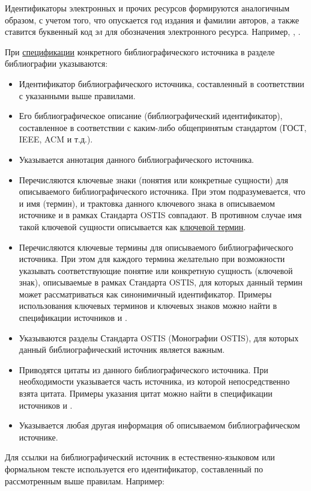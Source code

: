 Идентификаторы электронных и прочих ресурсов формируются аналогичным образом, с учетом того, что опускается год издания и фамилии авторов, а также ставится буквенный код \textit{эл} для обозначения электронного ресурса. Например, , .

При \underline{спецификации} конкретного библиографического источника в разделе библиографии указываются:

\begin{itemize}
	\item Идентификатор библиографического источника, составленный в соответствии с указанными выше правилами.
	\item Его библиографическое описание (библиографический идентификатор), составленное в соответствии с каким-либо общепринятым стандартом (ГОСТ, IEEE, ACM и т.д.).
	\item Указывается аннотация данного библиографического источника.
	\item Перечисляются ключевые знаки (понятия или конкретные сущности) для описываемого библиографического источника. При этом подразумевается, что и имя (термин), и трактовка данного ключевого знака в описываемом источнике и в рамках Стандарта OSTIS совпадают. В противном случае имя такой ключевой сущности описывается как \uline{ключевой термин}.
	\item Перечисляются ключевые термины для описываемого библиографического источника. При этом для каждого термина желательно при возможности указывать соответствующие понятие или конкретную сущность (ключевой знак), описываемые в рамках Стандарта OSTIS, для которых данный термин может рассматриваться как синонимичный идентификатор. Примеры использования ключевых терминов и ключевых знаков можно найти в спецификации источников  и .
	\item Указываются разделы Стандарта OSTIS (Монографии OSTIS), для которых данный библиографический источник является важным.
	\item Приводятся цитаты из данного библиографического источника. При необходимости указывается часть источника, из которой непосредственно взята цитата. Примеры указания цитат можно найти в спецификации источников  и .
	\item Указывается любая другая информация об описываемом библиографическом источнике.
\end{itemize}

Для ссылки на библиографический источник в естественно-языковом или формальном тексте используется его идентификатор, составленный по рассмотренным выше правилам. Например: 

